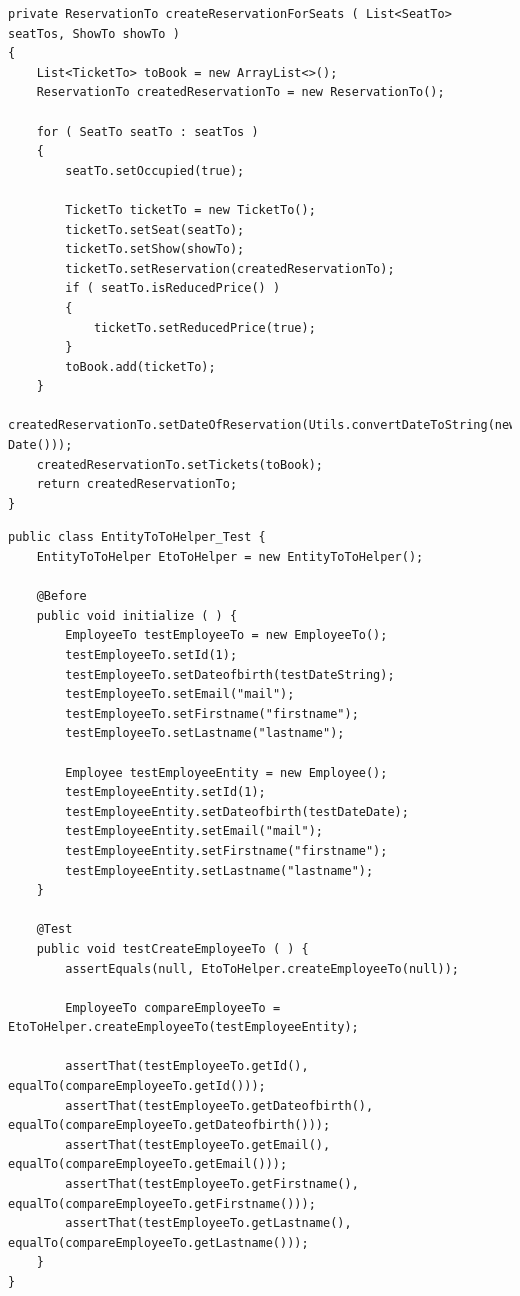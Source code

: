 \newpage

\begin{lstlisting}[style=lstJava, caption={Erstellen eines Reservierungs-\acs{DTO}s}, label={lst:Anhang_Erstellen_Reservierung}]
private ReservationTo createReservationForSeats ( List<SeatTo> seatTos, ShowTo showTo )
{
	List<TicketTo> toBook = new ArrayList<>();
	ReservationTo createdReservationTo = new ReservationTo();
		
	for ( SeatTo seatTo : seatTos )
	{
		seatTo.setOccupied(true);
	
		TicketTo ticketTo = new TicketTo();
		ticketTo.setSeat(seatTo);
		ticketTo.setShow(showTo);
		ticketTo.setReservation(createdReservationTo);
		if ( seatTo.isReducedPrice() )
		{
			ticketTo.setReducedPrice(true);
		}
		toBook.add(ticketTo);
	}
	createdReservationTo.setDateOfReservation(Utils.convertDateToString(new Date()));
	createdReservationTo.setTickets(toBook);
	return createdReservationTo;
}
\end{lstlisting}

\newpage

\begin{lstlisting}[style=lstJava, caption={Ausschnitt der Test-Klasse der EntityToToHelper-Klasse}, label={src:entitytotohelpertest}, tabsize=2]
public class EntityToToHelper_Test {
	EntityToToHelper EtoToHelper = new EntityToToHelper();

	@Before
	public void initialize ( ) {
		EmployeeTo testEmployeeTo = new EmployeeTo();
		testEmployeeTo.setId(1);
		testEmployeeTo.setDateofbirth(testDateString);
		testEmployeeTo.setEmail("mail");
		testEmployeeTo.setFirstname("firstname");
		testEmployeeTo.setLastname("lastname");

		Employee testEmployeeEntity = new Employee();
		testEmployeeEntity.setId(1);
		testEmployeeEntity.setDateofbirth(testDateDate);
		testEmployeeEntity.setEmail("mail");
		testEmployeeEntity.setFirstname("firstname");
		testEmployeeEntity.setLastname("lastname");
	}

	@Test
	public void testCreateEmployeeTo ( ) {
		assertEquals(null, EtoToHelper.createEmployeeTo(null));

		EmployeeTo compareEmployeeTo = EtoToHelper.createEmployeeTo(testEmployeeEntity);

		assertThat(testEmployeeTo.getId(), equalTo(compareEmployeeTo.getId()));
		assertThat(testEmployeeTo.getDateofbirth(), equalTo(compareEmployeeTo.getDateofbirth()));
		assertThat(testEmployeeTo.getEmail(), equalTo(compareEmployeeTo.getEmail()));
		assertThat(testEmployeeTo.getFirstname(), equalTo(compareEmployeeTo.getFirstname()));
		assertThat(testEmployeeTo.getLastname(), equalTo(compareEmployeeTo.getLastname()));
	}
}
\end{lstlisting}
